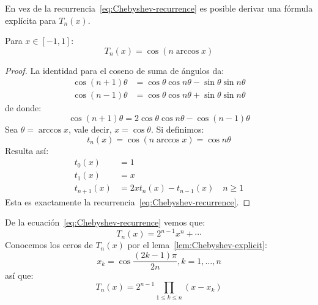   En vez de la recurrencia~\eqref{eq:Chebyshev-recurrence}
  es posible derivar una fórmula explícita para \(T_n(x)\).
  \begin{lemma}
    \label{lem:Chebyshev-explicit}
    Para \(x \in [-1, 1]\):
    \begin{equation}
      \label{eq:Chebyshev-explicit}
      T_n(x)
        = \cos(n \arccos x)
    \end{equation}
  \end{lemma}
  \begin{proof}
    La identidad para el coseno de suma de ángulos da:
    \begin{align*}
      \cos (n + 1) \theta
        &= \cos \theta \cos n \theta - \sin \theta \sin n \theta \\
      \cos (n - 1) \theta
        &= \cos \theta \cos n \theta + \sin \theta \sin n \theta
    \end{align*}
    de donde:
    \begin{equation*}
      \cos (n + 1) \theta
        = 2 \cos \theta \cos n \theta - \cos (n - 1) \theta
    \end{equation*}
    Sea \(\theta = \arccos x\),
    vale decir,
    \(x = \cos \theta\).
    Si definimos:
    \begin{equation*}
      t_n(x)
        = \cos (n \arccos x)
        = \cos n \theta
    \end{equation*}
    Resulta así:
    \begin{align*}
      t_0(x)
        &= 1 \\
      t_1(x)
        &= x \\
      t_{n + 1}(x)
        &= 2 x t_n(x) - t_{n - 1}(x)
          \quad n \ge 1
    \end{align*}
    Esta es exactamente la recurrencia~\eqref{eq:Chebyshev-recurrence}.
  \end{proof}
  De la ecuación~\eqref{eq:Chebyshev-recurrence}
  vemos que:
  \begin{equation*}
    T_n(x)
      = 2^{n - 1} x^n + \dotsb
  \end{equation*}
  Conocemos los ceros de \(T_n(x)\) por el lema~\ref{lem:Chebyshev-explicit}:
  \begin{equation*}
    x_k
      = \cos \frac{(2 k - 1) \pi}{2 n}, k = 1, \dotsc, n
  \end{equation*}
  así que:
  \begin{equation*}
    T_n(x)
      = 2^{n - 1} \prod_{1 \le k \le n} (x - x_k)
  \end{equation*}

